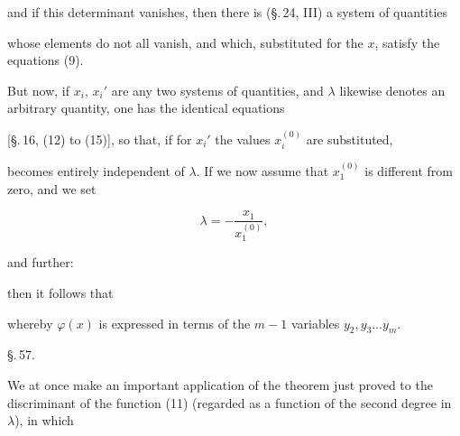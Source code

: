 

and if this determinant vanishes, then there is (\S.\,24, III) a system of quantities


whose elements do not all vanish, and which, substituted for the $x$, satisfy the equations (9).

But now, if $x_i$, $x_i'$ are any two systems of quantities, and $\lambda$ likewise denotes an arbitrary quantity, one has the identical equations


[\S.\,16, (12) to (15)], so that, if for $x_i'$ the values $x_i^{(0)}$ are substituted,


becomes entirely independent of $\lambda$. If we now assume that $x_1^{(0)}$ is different from zero, and we set

\[
\lambda = -\frac{x_1}{x_1^{(0)}},
\]

and further:


then it follows that


whereby $\varphi(x)$ is expressed in terms of the $m - 1$ variables $y_2, y_3 \ldots y_m$.

\begin{center}
\S.\,57.

\end{center}

We at once make an important application of the theorem just proved to the discriminant of the function (11) (regarded as a function of the second degree in $\lambda$), in which
